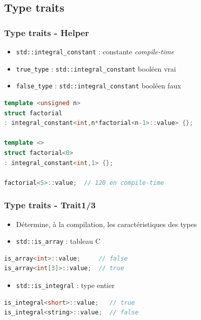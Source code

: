 \documentclass[C++.tex]{subfiles}
\begin{document}
\subsection*{Type traits}
\begin{frame}[fragile]
	\frametitle{Type traits - Helper}
	\begin{itemize}
		\item \lstinline|std::integral_constant| : constante \textit{compile-time}
		\item \lstinline|true_type| : \lstinline|std::integral_constant| booléen vrai
		\item \lstinline|false_type| : \lstinline|std::integral_constant| booléen faux
	\end{itemize}

	\begin{lstlisting}[language=C++]
template <unsigned n>
struct factorial 
: integral_constant<int,n*factorial<n-1>::value> {};

template <>
struct factorial<0> 
: integral_constant<int,1> {};

factorial<5>::value;  // 120 en compile-time\end{lstlisting}
\end{frame}

\begin{frame}[fragile]
	\frametitle{Type traits - Trait\titlehfill{}1/3}
	\begin{itemize}
		\item Détermine, à la compilation, les caractéristiques des types
		\item \lstinline|std::is_array| : tableau C
	\end{itemize}

	\begin{lstlisting}[language=C++]
is_array<int>::value;     // false
is_array<int[3]>::value;  // true\end{lstlisting}

	\begin{itemize}
		\item \lstinline|std::is_integral| : type entier
	\end{itemize}

	\begin{lstlisting}[language=C++]
is_integral<short>::value;   // true
is_integral<string>::value;  // false\end{lstlisting}
\end{frame}
\end{document}
